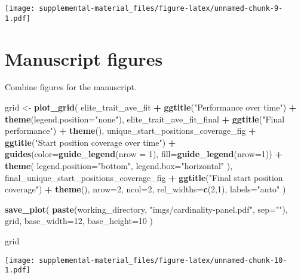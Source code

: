 \documentclass[]{book}
\newenvironment{Shaded}{\begin{snugshade}}{\end{snugshade}}
\newcommand{\DataTypeTok}[1]{\textcolor[rgb]{0.13,0.29,0.53}{#1}}
\newcommand{\DecValTok}[1]{\textcolor[rgb]{0.00,0.00,0.81}{#1}}
\newcommand{\KeywordTok}[1]{\textcolor[rgb]{0.13,0.29,0.53}{\textbf{#1}}}
\newcommand{\NormalTok}[1]{#1}
\newcommand{\OperatorTok}[1]{\textcolor[rgb]{0.81,0.36,0.00}{\textbf{#1}}}
\newcommand{\StringTok}[1]{\textcolor[rgb]{0.31,0.60,0.02}{#1}}
\begin{document}
\texttt{[image: supplemental-material\_files/figure-latex/unnamed-chunk-9-1.pdf]}

\hypertarget{manuscript-figures}{%
\section{Manuscript figures}\label{manuscript-figures}}

Combine figures for the manuscript.

\begin{Shaded}
\begin{Highlighting}[]
\NormalTok{grid <-}\StringTok{ }\KeywordTok{plot_grid}\NormalTok{(}
\NormalTok{  elite_trait_ave_fit }\OperatorTok{+}
\StringTok{    }\KeywordTok{ggtitle}\NormalTok{(}\StringTok{"Performance over time"}\NormalTok{) }\OperatorTok{+}
\StringTok{    }\KeywordTok{theme}\NormalTok{(}\DataTypeTok{legend.position=}\StringTok{"none"}\NormalTok{),}
\NormalTok{  elite_trait_ave_fit_final }\OperatorTok{+}
\StringTok{    }\KeywordTok{ggtitle}\NormalTok{(}\StringTok{"Final performance"}\NormalTok{) }\OperatorTok{+}
\StringTok{    }\KeywordTok{theme}\NormalTok{(),}
\NormalTok{  unique_start_positions_coverage_fig }\OperatorTok{+}
\StringTok{    }\KeywordTok{ggtitle}\NormalTok{(}\StringTok{"Start position coverage over time"}\NormalTok{) }\OperatorTok{+}
\StringTok{    }\KeywordTok{guides}\NormalTok{(}\DataTypeTok{color=}\KeywordTok{guide_legend}\NormalTok{(}\DataTypeTok{nrow =} \DecValTok{1}\NormalTok{), }\DataTypeTok{fill=}\KeywordTok{guide_legend}\NormalTok{(}\DataTypeTok{nrow=}\DecValTok{1}\NormalTok{)) }\OperatorTok{+}
\StringTok{    }\KeywordTok{theme}\NormalTok{(}
      \DataTypeTok{legend.position=}\StringTok{"bottom"}\NormalTok{,}
      \DataTypeTok{legend.box=}\StringTok{"horizontal"}
\NormalTok{    ),}
\NormalTok{  final_unique_start_positions_coverage_fig }\OperatorTok{+}
\StringTok{    }\KeywordTok{ggtitle}\NormalTok{(}\StringTok{"Final start position coverage"}\NormalTok{) }\OperatorTok{+}
\StringTok{    }\KeywordTok{theme}\NormalTok{(),}
  \DataTypeTok{nrow=}\DecValTok{2}\NormalTok{,}
  \DataTypeTok{ncol=}\DecValTok{2}\NormalTok{,}
  \DataTypeTok{rel_widths=}\KeywordTok{c}\NormalTok{(}\DecValTok{2}\NormalTok{,}\DecValTok{1}\NormalTok{),}
  \DataTypeTok{labels=}\StringTok{"auto"}
\NormalTok{)}

\KeywordTok{save_plot}\NormalTok{(}
  \KeywordTok{paste}\NormalTok{(working_directory, }\StringTok{"imgs/cardinality-panel.pdf"}\NormalTok{, }\DataTypeTok{sep=}\StringTok{""}\NormalTok{),}
\NormalTok{  grid,}
  \DataTypeTok{base_width=}\DecValTok{12}\NormalTok{,}
  \DataTypeTok{base_height=}\DecValTok{10}
\NormalTok{)}

\NormalTok{grid}
\end{Highlighting}
\end{Shaded}

\texttt{[image: supplemental-material\_files/figure-latex/unnamed-chunk-10-1.pdf]}


\end{document}
